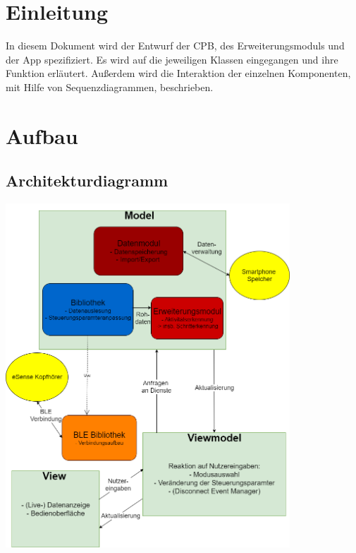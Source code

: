 \documentclass[a4paper,12pt]{article}
\title{\projektName}
\date{\today}
\author{Tec O'Brain}
\begin{document}
 \setcounter{page}{2}
 \tableofcontents          %
 \clearpage

\section{Einleitung}
In diesem Dokument wird der Entwurf der \Gls{CPB}, des Erweiterungsmoduls und der App spezifiziert. Es wird auf die jeweiligen Klassen eingegangen und ihre Funktion erläutert. Außerdem wird die Interaktion der einzelnen Komponenten, mit Hilfe von Sequenzdiagrammen, beschrieben.

\section{Aufbau}
	\subsection{Architekturdiagramm}
	\begin{center}
		\vspace{100px}
		\includegraphics[width=0.8\textwidth]{./Diagramme/Achi5.png}
	\end{center}
	\clearpage %
\end{document}
